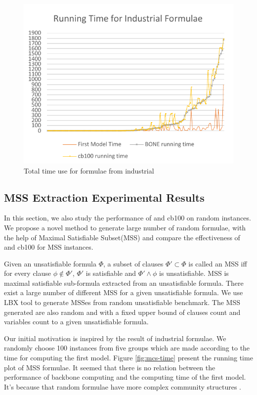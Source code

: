\begin{figure}
    \centering
    \includegraphics[scale=0.7]{ind2.pdf}
   \caption{Total time use for formulae from industrial}
   \label{fig:ind-time}
\end{figure}

\subsection{MSS Extraction Experimental Results}
In this section, we also study the performance of \tool and cb100 on random instances.
We propose a novel method to generate large number of random formulae, with the help of Maximal Satisfiable Subset(MSS) and compare the effectiveness of \tool and cb100 for MSS instances.

Given an unsatisfiable formula $\Phi$, a subset of clauses $\Phi'\subset\Phi$ is called an MSS iff for every clause $\phi\notin\Phi'$, $\Phi'$ is satisfiable and $\Phi'\wedge\phi$ is unsatisfiable. MSS is maximal satisfiable sub-formula extracted from an unsatisfiable formula. There exist a large number of different MSS for a given unsatisfiable formula. We use LBX tool to generate MSSes from random unsatisfiable benchmark. The MSS generated are also random and with a fixed upper bound of clauses count and variables count to a given unsatisfiable formula.

Our initial motivation is inspired by the result of industrial formulae.
We randomly choose 100 instances from five groups which are made according to the time for computing the first model. Figure \ref{fig:mcs-time} present the running time plot of MSS formulae. It seemed that there is no relation between the performance of backbone computing and the computing time of the first model.
It's because that random formulae have more complex community structures \cite{NZG2014,LJG2015SAT,LJG015}.

